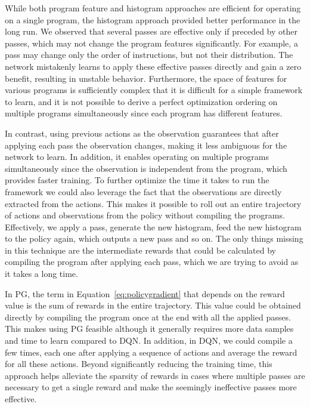 While both program feature and histogram approaches are efficient for operating on a single program, the histogram approach provided better performance in the long run. We observed that several passes are effective only if preceded by other passes, which may not change the program features significantly. For example, a pass may change only the order of instructions, but not their distribution. The network mistakenly learns to apply these effective passes directly and gain a zero benefit, resulting in unstable behavior. Furthermore, the space of features for various programs is sufficiently complex that it is difficult for a simple framework to learn, and it is not possible to derive a perfect optimization ordering on multiple programs simultaneously since each program has different features.

In contrast, using previous actions as the observation guarantees that after applying each pass the observation changes, making it less ambiguous for the network to learn. In addition, it enables operating on multiple programs simultaneously since the observation is independent from the program, which provides faster training. To further optimize the time it takes to run the framework we could also leverage the fact that the observations are directly extracted from the actions. This makes it possible to roll out an entire trajectory of actions and observations from the policy without compiling the programs. Effectively, we apply a pass, generate the new histogram, feed the new histogram to the policy again, which outputs a new pass and so on. The only things missing in this technique are the intermediate rewards that could be calculated by compiling the program after applying each pass, which we are trying to avoid as it takes a long time. 

In PG, the term in Equation~\ref{eq:policygradient} that depends on the reward value is the sum of rewards in the entire trajectory. This value could be obtained directly by compiling the program once at the end with all the applied passes. This makes using PG feasible although it generally requires more data samples and time to learn compared to DQN. In addition, in DQN, we could %
compile a few times, each one after applying a sequence of actions and average the reward for all these actions. Beyond significantly reducing the training time, this approach helps alleviate the sparsity of rewards in cases where multiple passes are necessary to get a single reward and make the seemingly ineffective passes more effective. 


